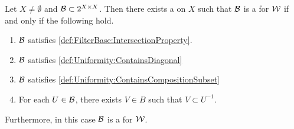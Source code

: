 \begin{prop}
\label{prop:FundamentalSystemOfEntouragesCharacterization}
Let $X \neq \emptyset$ and $\mathcal{B} \subset 2^{X \times X}$. 
Then there exists a \Uniformity \scW on $X$
such that $\mathcal{B}$  is a \FundamentalSystemOfEntourages for $\mathcal{W}$ if and only if 
the following hold.
\begin{enumerate}
   \item $\mathcal{B}$ satisfies \ref{def:FilterBase:IntersectionProperty}.
   \item $\mathcal{B}$ satisfies \ref{def:Uniformity:ContainsDiagonal}
   \item $\mathcal{B}$ satisfies \ref{def:Uniformity:ContainsCompositionSubset}
   \item For each $U \in \mathcal{B}$, there exists $V \in B$ such that $V \subset U^{-1}$. 
\end{enumerate}

Furthermore, in this case $\mathcal{B}$ is a \FilterBase for $\mathcal{W}$. 
\end{prop}
